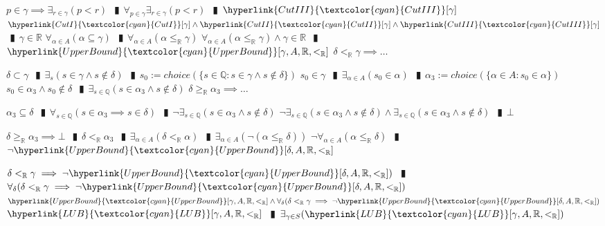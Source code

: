 \documentclass{book}
\newcommand{\rf}[1]{\hyperlink{#1}{\textcolor{cyan}{#1}}}
\newcommand{\abr}{:=}
\newcommand{\pipe}{$\phantom{(}\vrectangleblack\phantom{)}$}
\begin{document}
\begin{enumerate}
\begin{enumerate}
\begin{enumerate}
    \end{enumerate}
    \lit $p \in \gamma \implies \exists_{r \in \gamma}(p < r)$ \pipe $\forall_{p \in \gamma} \exists_{r \in \gamma}(p < r)$ \pipe $\rf{CutIII}[\gamma]$
    \lit $\rf{CutI}[\gamma] \land \rf{CutII}[\gamma] \land \rf{CutIII}[\gamma]$ \pipe $\gamma \in \mathbb{R}$
    \lit $\forall_{\alpha \in A}(\alpha \subseteq \gamma)$ \pipe $\forall_{\alpha \in A}(\alpha \leq_{\mathbb{R}} \gamma)$
    \lit $\forall_{\alpha \in A}(\alpha \leq_{\mathbb{R}} \gamma) \land \gamma \in \mathbb{R}$ \pipe $\rf{UpperBound}[\gamma, A, \mathbb{R}, <_{\mathbb{R}}]$
    \lit $\delta <_{\mathbb{R}} \gamma \implies \ldots$
    \begin{enumerate}
      \lit $\delta \subset \gamma$ \pipe $\exists_{s}(s \in \gamma \land s \notin \delta)$ \pipe $s_0 \abr choice(\{s \in \mathbb{Q} : s \in \gamma \land s \notin \delta\})$
      \lit $s_0 \in \gamma$ \pipe $\exists_{\alpha \in A}(s_0 \in \alpha)$ \pipe $\alpha_3 \abr choice(\{\alpha \in A : s_0 \in \alpha\})$
      \lit $s_0 \in \alpha_3 \land s_0 \notin \delta$ \pipe $\exists_{s \in \mathbb{Q}}(s \in \alpha_3 \land s \notin \delta)$
      \lit $\delta \geq_{\mathbb{R}} \alpha_3 \implies \ldots$
      \begin{enumerate}
        \lit $\alpha_3 \subseteq \delta$ \pipe $\forall_{s \in \mathbb{Q}}(s \in \alpha_3 \implies s \in \delta)$ \pipe $\lnot \exists_{s \in \mathbb{Q}}(s \in \alpha_3 \land s \notin \delta)$
        \lit $\lnot \exists_{s \in \mathbb{Q}}(s \in \alpha_3 \land s \notin \delta) \land \exists_{s \in \mathbb{Q}}(s \in \alpha_3 \land s \notin \delta)$ \pipe $\bot$
      \end{enumerate}
      \lit $\delta \geq_{\mathbb{R}} \alpha_3 \implies \bot$ \pipe $\delta <_{\mathbb{R}} \alpha_3$ \pipe $\exists_{\alpha \in A}(\delta <_{\mathbb{R}} \alpha)$ \pipe $\exists_{\alpha \in A}(\lnot(\alpha \leq_{\mathbb{R}} \delta))$
      \lit $\lnot \forall_{\alpha \in A}(\alpha \leq_{\mathbb{R}} \delta)$ \pipe $\lnot \rf{UpperBound}[\delta, A, \mathbb{R}, <_{\mathbb{R}}]$
    \end{enumerate}
    \lit $\delta <_{\mathbb{R}} \gamma \implies \lnot \rf{UpperBound}[\delta, A, \mathbb{R}, <_{\mathbb{R}}])$ \pipe $\forall_{\delta}(\delta <_{\mathbb{R}} \gamma \implies \lnot \rf{UpperBound}[\delta, A, \mathbb{R}, <_{\mathbb{R}}])$
    \lit $\rf{UpperBound}[\gamma, A, \mathbb{R}, <_{\mathbb{R}}] \land \forall_{\delta}(\delta <_{\mathbb{R}} \gamma \implies \lnot \rf{UpperBound}[\delta, A, \mathbb{R}, <_{\mathbb{R}}])$
    \lit $\rf{LUB}[\gamma, A, \mathbb{R}, <_{\mathbb{R}}]$ \pipe $\exists_{\gamma \in S}(\rf{LUB}[\gamma, A, \mathbb{R}, <_{\mathbb{R}}])$

\end{enumerate}
\end{enumerate}
\end{document}
